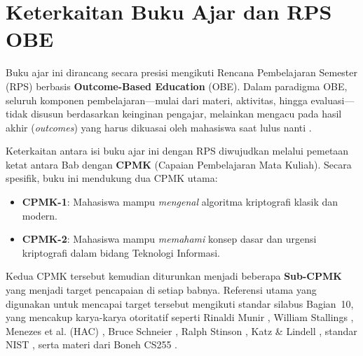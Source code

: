 \section{Keterkaitan Buku Ajar dan RPS OBE}

Buku ajar ini dirancang secara presisi mengikuti Rencana Pembelajaran Semester (RPS) berbasis \textbf{Outcome-Based Education} (OBE). Dalam paradigma OBE, seluruh komponen pembelajaran—mulai dari materi, aktivitas, hingga evaluasi—tidak disusun berdasarkan keinginan pengajar, melainkan mengacu pada hasil akhir (\textit{outcomes}) yang harus dikuasai oleh mahasiswa saat lulus nanti \cite{obe_wikipedia}.

Keterkaitan antara isi buku ajar ini dengan RPS diwujudkan melalui pemetaan ketat antara Bab dengan \textbf{CPMK} (Capaian Pembelajaran Mata Kuliah). Secara spesifik, buku ini mendukung dua CPMK utama:
\begin{itemize}
    \item \textbf{CPMK-1}: Mahasiswa mampu \textit{mengenal} algoritma kriptografi klasik dan modern.
    \item \textbf{CPMK-2}: Mahasiswa mampu \textit{memahami} konsep dasar dan urgensi kriptografi dalam bidang Teknologi Informasi.
\end{itemize}

Kedua CPMK tersebut kemudian diturunkan menjadi beberapa \textbf{Sub-CPMK} yang menjadi target pencapaian di setiap babnya. Referensi utama yang digunakan untuk mencapai target tersebut mengikuti standar silabus Bagian~10, yang mencakup karya-karya otoritatif seperti Rinaldi Munir \cite{munir2019,munir_slides_itb}, William Stallings \cite{stallings2017}, Menezes et al. (HAC) \cite{menezes1996,hac_online}, Bruce Schneier \cite{schneier1996}, Ralph Stinson \cite{stinson2018}, Katz \& Lindell \cite{katz2020}, standar NIST \cite{nist}, serta materi dari Boneh CS255 \cite{boneh_cs255}.

